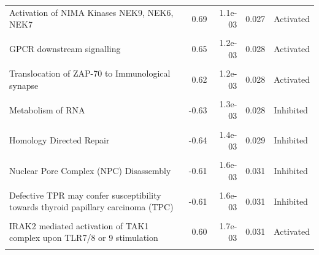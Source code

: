 \documentclass[9pt,a4paper,]{extarticle}
\begin{document}
\begin{table}
{\begin{tabular}[t]{lrrrl}
Activation of NIMA Kinases NEK9, NEK6, NEK7 & 0.69 & 1.1e-03 & 0.027 & Activated\\
\cellcolor{gray!6}{SUMO is transferred from E1 to E2 (UBE2I, UBC9)} & \cellcolor{gray!6}{-0.62} & \cellcolor{gray!6}{1.1e-03} & \cellcolor{gray!6}{0.027} & \cellcolor{gray!6}{Inhibited}\\
\addlinespace
GPCR downstream signalling & 0.65 & 1.2e-03 & 0.028 & Activated\\
\cellcolor{gray!6}{Phosphorylation of CD3 and TCR zeta chains} & \cellcolor{gray!6}{0.62} & \cellcolor{gray!6}{1.2e-03} & \cellcolor{gray!6}{0.028} & \cellcolor{gray!6}{Activated}\\
Translocation of ZAP-70 to Immunological synapse & 0.62 & 1.2e-03 & 0.028 & Activated\\
\cellcolor{gray!6}{PD-1 signaling} & \cellcolor{gray!6}{0.62} & \cellcolor{gray!6}{1.2e-03} & \cellcolor{gray!6}{0.028} & \cellcolor{gray!6}{Activated}\\
Metabolism of RNA & -0.63 & 1.3e-03 & 0.028 & Inhibited\\
\addlinespace
\cellcolor{gray!6}{Signaling by GPCR} & \cellcolor{gray!6}{0.65} & \cellcolor{gray!6}{1.3e-03} & \cellcolor{gray!6}{0.028} & \cellcolor{gray!6}{Activated}\\
Homology Directed Repair & -0.64 & 1.4e-03 & 0.029 & Inhibited\\
\cellcolor{gray!6}{RHOB GTPase cycle} & \cellcolor{gray!6}{0.65} & \cellcolor{gray!6}{1.5e-03} & \cellcolor{gray!6}{0.030} & \cellcolor{gray!6}{Activated}\\
Nuclear Pore Complex (NPC) Disassembly & -0.61 & 1.6e-03 & 0.031 & Inhibited\\
\cellcolor{gray!6}{SLC transporter disorders} & \cellcolor{gray!6}{-0.61} & \cellcolor{gray!6}{1.6e-03} & \cellcolor{gray!6}{0.031} & \cellcolor{gray!6}{Inhibited}\\
\addlinespace
Defective TPR may confer susceptibility towards thyroid papillary carcinoma (TPC) & -0.61 & 1.6e-03 & 0.031 & Inhibited\\
\cellcolor{gray!6}{Termination of translesion DNA synthesis} & \cellcolor{gray!6}{-0.68} & \cellcolor{gray!6}{1.6e-03} & \cellcolor{gray!6}{0.031} & \cellcolor{gray!6}{Inhibited}\\
IRAK2 mediated activation of TAK1 complex upon TLR7/8 or 9 stimulation & 0.60 & 1.7e-03 & 0.031 & Activated\\
\cellcolor{gray!6}{Gap-filling DNA repair synthesis and ligation in TC-NER} & \cellcolor{gray!6}{-0.71} & \cellcolor{gray!6}{1.7e-03} & \cellcolor{gray!6}{0.031} & \cellcolor{gray!6}{Inhibited}\\

\end{tabular}}
\end{table}
\end{document}
